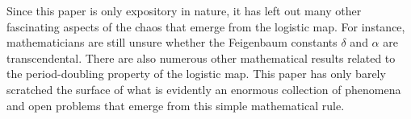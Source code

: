 \documentclass[twocolumn,amsmath,amssymb,aps]{revtex4}
\begin{document}
Since this paper is only expository in nature, it has left out many other fascinating aspects of the chaos that emerge from the logistic map. For instance, mathematicians are still unsure whether the Feigenbaum constants $\delta$ and $\alpha$ are transcendental. There are also numerous other mathematical results related to the period-doubling property of the logistic map. This paper has only barely scratched the surface of what is evidently an enormous collection of phenomena and open problems that emerge from this simple mathematical rule. 





\end{document}
